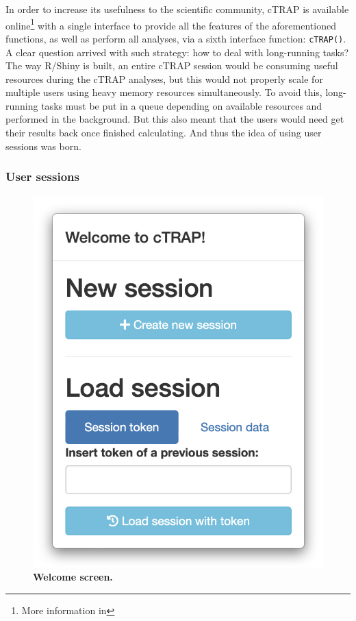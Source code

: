 In order to increase its usefulness to the scientific community, cTRAP is available online\footnote{More information in } with a single interface to provide all the features of the aforementioned functions, as well as perform all analyses, via a sixth interface function: \texttt{cTRAP()}. A clear question arrived with such strategy: how to deal with long-running tasks? The way R/Shiny is built, an entire cTRAP session would be consuming useful resources during the cTRAP analyses, but this would not properly scale for multiple users using heavy memory resources simultaneously. To avoid this, long-running tasks must be put in a queue depending on available resources and performed in the background. But this also meant that the users would need get their results back once finished calculating. And thus the idea of using user sessions was born.

\subsubsection{User sessions}
\label{sec:ctrap-web}

\begin{figure}
  \vspace{-\intextsep}
  \includegraphics[width=\linewidth]{images/ctrap/welcome}
  \caption[Welcome screen modal]{\textbf{Welcome screen.}}
  \vspace{-\intextsep}
  \label{fig:ctrap-welcome}
\end{figure}

